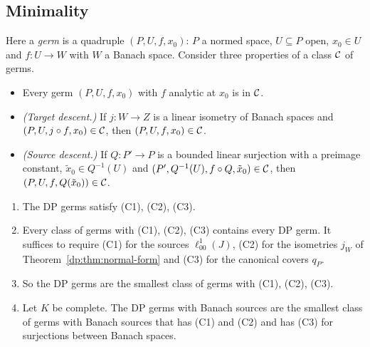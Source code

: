\subsection{Minimality}\label{dp:ssec:minimal}

Here a \emph{germ} is a quadruple $(P,U,f,x_0)$: $P$ a normed space, $U\subseteq P$ open, $x_0\in U$ and $f\colon U\to W$ with $W$ a Banach space. Consider three properties of a class $\mathcal{C}$ of germs.
\begin{itemize}
\item[(C1)] Every germ $(P,U,f,x_0)$ with $f$ analytic at $x_0$ is in $\mathcal{C}$.
\item[(C2)] \emph{(Target descent.)} If $j\colon W\to Z$ is a linear isometry of Banach spaces and $(P,U,j\circ f,x_0)\in\mathcal{C}$, then $(P,U,f,x_0)\in\mathcal{C}$.
\item[(C3)] \emph{(Source descent.)} If $Q\colon P'\to P$ is a bounded linear surjection with a preimage constant, $\tilde x_0\in Q^{-1}(U)$ and $(P',Q^{-1}(U),f\circ Q,\tilde x_0)\in\mathcal{C}$, then $(P,U,f,Q(\tilde x_0))\in\mathcal{C}$.
\end{itemize}

\begin{theorem}\label{dp:thm:minimal}
\leavevmode
\begin{enumerate}
\item The DP germs satisfy (C1), (C2), (C3).
\item Every class of germs with (C1), (C2), (C3) contains every DP germ. It suffices to require (C1) for the sources $\ell^1_{00}(J)$, (C2) for the isometries $j_W$ of Theorem~\ref{dp:thm:normal-form} and (C3) for the canonical covers $q_P$.
\item So the DP germs are the smallest class of germs with (C1), (C2), (C3).
\item Let $K$ be complete. The DP germs with Banach sources are the smallest class of germs with Banach sources that has (C1) and (C2) and has (C3) for surjections between Banach spaces.
\end{enumerate}
\end{theorem}

